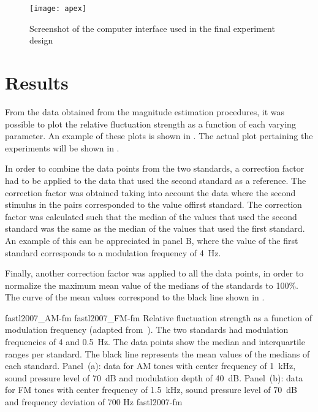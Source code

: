 \documentclass[../main.tex]{subfiles}
\begin{document}
\begin{figure}[!ht]
  \centering
  \texttt{[image: apex]}
  \caption{Screenshot of the computer interface used in the final experiment
    design}
\label{fig:apex}
\end{figure}

\section{Results}

From the data obtained from the magnitude estimation procedures, it was possible
to plot the relative fluctuation strength as a function of each varying
parameter. An example of these plots is shown in . The
actual plot pertaining the experiments will be shown in
.

In order to combine the data points from the two standards, a correction factor
had to be applied to the data that used the second standard as a reference. The
correction factor was obtained taking into account the data where the second
stimulus in the pairs corresponded to the value offirst standard. The
correction factor was calculated such that the median of the values that used
the second standard was the same as the median of the values that used the first
standard. An example of this can be appreciated in  panel
B, where the value of the first standard corresponds to a modulation frequency
of 4~Hz.

Finally, another correction factor was applied to all the data points, in order
to normalize the maximum mean value of the medians of the standards to 100\%.
The curve of the mean values correspond to the black line shown in
.

\myfigurepairlabeled%
  {fastl2007_AM-fm}
  {fastl2007_FM-fm}
  {Relative fluctuation strength as a function of modulation frequency (adapted
    from~\cite[pp.248]{Fastl2007Psychoacoustics}). The two standards had
    modulation frequencies of 4 and 0.5~Hz. The data points show the median and
    interquartile ranges per standard. The black line represents the mean values
    of the medians of each standard. Panel~(a): data for \gls{AM} tones with
    center frequency of 1~kHz, sound pressure level of 70~dB and modulation
    depth of 40~dB. Panel~(b): data for \gls{FM} tones with center frequency
    of 1.5~kHz, sound pressure level of 70~dB and frequency deviation of 700 Hz}
  {fastl2007-fm}
\end{document}
